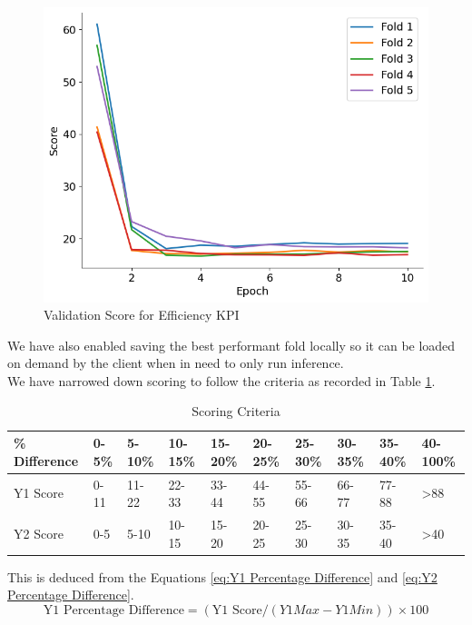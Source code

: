 \documentclass{report} %
\begin{document}
\begin{figure}[H]
    \begin{minipage}[b]{0.325\textwidth}
        \includegraphics[width=\textwidth]{./ReportImages/val_score_y2.png}
        \caption{\centering Validation Score for Efficiency \ac{KPI}}
        \label{fig:Validation Score for Efficiency grid}
    \end{minipage}
\end{figure}

We have also enabled saving the best performant fold locally so it can be loaded on demand by the client when in need to only run inference.\\
We have narrowed down scoring to follow the criteria as recorded in Table \ref{tab:Scoring Criteria}.

\begin{table}[H]
    \centering
    \begin{tabularx}{1\linewidth}{|X|X|X|X|X|X|X|X|X|X|}
    \hline {\bf \% Difference} & {\bf 0-5\%} & {\bf 5-10\%} & {\bf 10-15\%} & {\bf 15-20\%} & {\bf 20-25\%} & {\bf 25-30\%} & {\bf 30-35\%} & {\bf 35-40\%} & {\bf 40-100\%}\\
    \hline 
    Y1 Score& 0-11& 11-22 & 22-33 & 33-44 & 44-55& 55-66 & 66-77 & 77-88 & \textgreater 88\\
    Y2 Score& 0-5 & 5-10 & 10-15 & 15-20 & 20-25& 25-30 & 30-35 & 35-40 &\textgreater 40\\
    \hline
    \end{tabularx}
    \caption{Scoring Criteria}
    \label{tab:Scoring Criteria}
\end{table}

This is deduced from the Equations \ref{eq:Y1 Percentage Difference} and \ref{eq:Y2 Percentage Difference}.
\begin{equation}
    \text{Y1 Percentage Difference} = (\text{Y1 Score} / {(Y1 Max - Y1 Min)})  \times 100
    \label{eq:Y1 Percentage Difference}
\end{equation}
\end{document}

